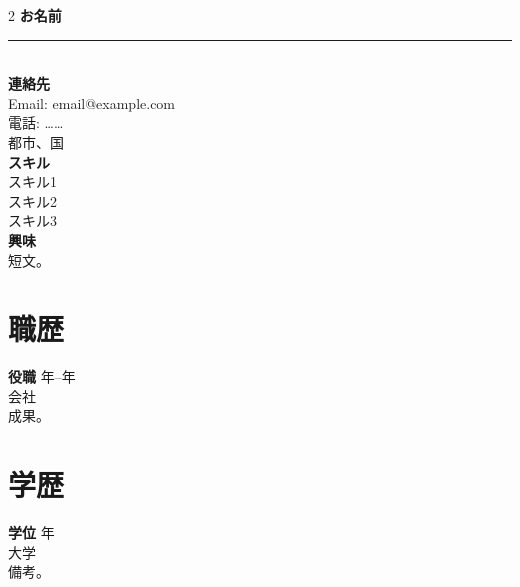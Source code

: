 \documentclass[11pt,a4paper]{article}
\begin{document}
\begin{paracol}{2}
\setlength{\parindent}{0pt}
{\large \textbf{お名前}}\\[0.2em]
\rule{\linewidth}{2.2cm}\\[0.5em]
\textbf{連絡先}\\
Email: email@example.com\\
電話: ……\\
都市、国\\[0.6em]
\textbf{スキル}\\
スキル1\\ スキル2\\ スキル3\\[0.6em]
\textbf{興味}\\
短文。

\switchcolumn
\section*{職歴}
\textbf{役職} \hfill 年--年 \\
会社 \\
成果。

\section*{学歴}
\textbf{学位} \hfill 年 \\
大学 \\
備考。
\end{paracol}
\end{document}
